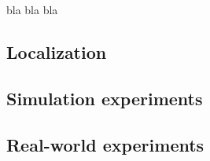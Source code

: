 bla bla bla

\subsection{Localization}

\subsection{Simulation experiments}

\subsection{Real-world experiments}
